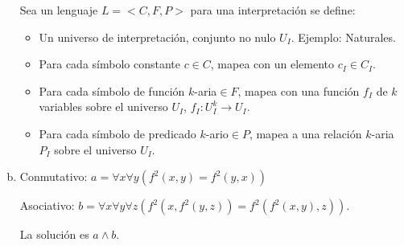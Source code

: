 \begin{questions}
\begin{solution}
\begin{enumerate}[a)]
  Sea un lenguaje $L=< C,F,P>$ para una interpretaci\'on se define: 
  \begin{itemize}
   \item Un universo de interpretaci\'on, conjunto no nulo $U_I$. Ejemplo: Naturales. 
   \item Para cada s\'imbolo constante $c\in C$, mapea con un elemento $c_I \in C_I$. 
   \item Para cada s\'imbolo de funci\'on $k$-aria$\in F$, mapea con una funci\'on $f_I$ de $k$ variables sobre el universo $U_I$, $f_I : U_I^k \rightarrow U_I$. 
   \item Para cada s\'imbolo de predicado $k$-ario$\in P$, mapea a una relaci\'on $k$-aria $P_I$ sobre el universo $U_I$. 
  \end{itemize}
  
  \item Conmutativo: $a = \forall x \forall y(f^2(x,y)=f^2(y,x))$
  
  Asociativo: $b=\forall x\forall y\forall z(f^2(x,f^2(y,z)) = f^2(f^2(x,y),z))$.
  
  La soluci\'on es $a\wedge b$. 
 \end{enumerate}

\end{solution}

\end{questions}

